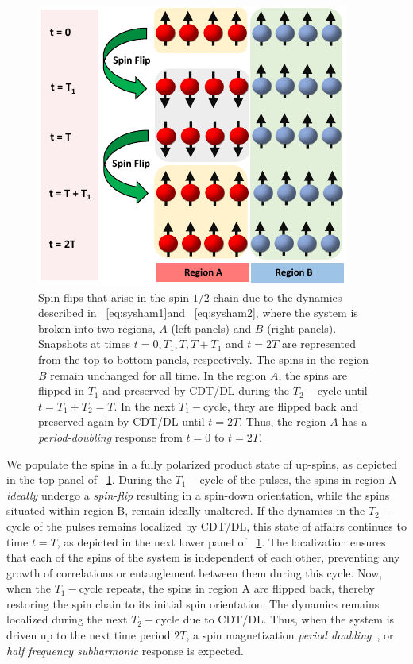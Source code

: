\documentclass[12pt]{iopart}
\providecommand{\DIFaddtex}[1]{{\protect\color{red}\uwave{#1}}} %
\providecommand{\DIFdeltex}[1]{{}}                      %
\providecommand{\DIFaddbegin}{} %
\providecommand{\DIFaddend}{} %
\providecommand{\DIFdelbegin}{} %
\providecommand{\DIFdelend}{} %
\providecommand{\DIFaddFL}[1]{\DIFadd{#1}} %
\providecommand{\DIFdelFL}[1]{\DIFdel{#1}} %
\providecommand{\DIFaddbeginFL}{} %
\providecommand{\DIFaddendFL}{} %
\providecommand{\DIFdelbeginFL}{} %
\providecommand{\DIFdelendFL}{} %
\providecommand{\DIFadd}[1]{\texorpdfstring{\DIFaddtex{#1}}{#1}} %
\providecommand{\DIFdel}[1]{\texorpdfstring{\DIFdeltex{#1}}{}} %
\newcommand{\DIFscaledelfig}{0.5}
\newlength{\DIFdelgraphicswidth} %
\newlength{\DIFdelgraphicsheight} %
\newcommand{\DIFaddincludegraphics}[2][]{{\color{blue}\fbox{\DIFOincludegraphics[#1]{#2}}}} %
\newcommand{\DIFdelincludegraphics}[2][]{%
\sbox{\DIFdelgraphicsbox}{\DIFOincludegraphics[#1]{#2}}%
\settoboxwidth{\DIFdelgraphicswidth}{\DIFdelgraphicsbox} %
\settoboxtotalheight{\DIFdelgraphicsheight}{\DIFdelgraphicsbox} %
\scalebox{\DIFscaledelfig}{%
\parbox[b]{\DIFdelgraphicswidth}{\usebox{\DIFdelgraphicsbox}\\[-\baselineskip] \rule{\DIFdelgraphicswidth}{0em}}\llap{\resizebox{\DIFdelgraphicswidth}{\DIFdelgraphicsheight}{%
\setlength{\unitlength}{\DIFdelgraphicswidth}%
\begin{picture}(1,1)%
\thicklines\linethickness{2pt} %
{\color[rgb]{1,0,0}\put(0,0){\framebox(1,1){}}}%
{\color[rgb]{1,0,0}\put(0,0){\line( 1,1){1}}}%
{\color[rgb]{1,0,0}\put(0,1){\line(1,-1){1}}}%
\end{picture}%
}\hspace*{3pt}}} %
} %
\DeclareRobustCommand{\DIFaddbegin}{\DIFOaddbegin \let\includegraphics\DIFaddincludegraphics} %
\DeclareRobustCommand{\DIFaddend}{\DIFOaddend \let\includegraphics\DIFOincludegraphics} %
\DeclareRobustCommand{\DIFdelbegin}{\DIFOdelbegin \let\includegraphics\DIFdelincludegraphics} %
\DeclareRobustCommand{\DIFdelend}{\DIFOaddend \let\includegraphics\DIFOincludegraphics} %
\DeclareRobustCommand{\DIFaddbeginFL}{\DIFOaddbeginFL \let\includegraphics\DIFaddincludegraphics} %
\DeclareRobustCommand{\DIFaddendFL}{\DIFOaddendFL \let\includegraphics\DIFOincludegraphics} %
\DeclareRobustCommand{\DIFdelbeginFL}{\DIFOdelbeginFL \let\includegraphics\DIFdelincludegraphics} %
\DeclareRobustCommand{\DIFdelendFL}{\DIFOaddendFL \let\includegraphics\DIFOincludegraphics} %
\begin{document}
\begin{figure}[t!]
    \centering
    \includegraphics[width=7.cm]{figure2.pdf}
    \caption{Spin-flips that arise in the spin-$1/2$ chain due to the dynamics described in \DIFdelbeginFL \DIFdelFL{Eqs.}\DIFdelendFL \DIFaddbeginFL \DIFaddFL{equations (}\DIFaddendFL ~\ref{eq:sysham1}\DIFaddbeginFL \DIFaddFL{) }\DIFaddendFL and \DIFaddbeginFL \DIFaddFL{(}\DIFaddendFL ~\ref{eq:sysham2}\DIFaddbeginFL \DIFaddFL{)}\DIFaddendFL , where the system is broken into two regions, $A$ (left panels) and $B$ (right panels). Snapshots at times $t=0, T_1, T, T+T_1 $ and $t=2T$ are represented from the top to bottom panels, respectively. The spins in the region $B$ remain unchanged for all time. In the region $A$, the spins are flipped in $T_1$ and preserved by CDT/DL during the $T_2-$cycle until $t=T_1+T_2=T$. In the next $T_1-$cycle, they are flipped back and preserved again by CDT/DL until $t=2T$. Thus, the region $A$ has a \textit{period-doubling} response from $t=0$ to $t=2T$.}
    \label{Fig:spinflip}
\end{figure}

	We populate the spins in a fully polarized product state of up-spins, as depicted in the top panel of \DIFdelbegin \DIFdel{Fig.}\DIFdelend \DIFaddbegin \DIFadd{figure}\DIFaddend ~\ref{Fig:spinflip}. During the $T_1-$cycle of the pulses,  the spins in region A \textit{ideally} undergo a \textit{spin-flip} resulting in a spin-down orientation, while the spins situated within region B, remain ideally unaltered. If the dynamics in the $T_2-$cycle of the pulses remains localized by CDT/DL, this state of affairs continues to time $t=T$, as depicted in the next lower panel of \DIFdelbegin \DIFdel{Fig.}\DIFdelend \DIFaddbegin \DIFadd{figure}\DIFaddend ~\ref{Fig:spinflip}. The localization ensures that each of the spins of the system is independent of each other, preventing any growth of correlations or entanglement between them during this cycle. Now, when the $T_1-$cycle repeats, the spins in region A are flipped back, thereby restoring the spin chain to its initial spin orientation. The dynamics remains localized during the next $T_2-$cycle due to CDT/DL. Thus, when the system is driven up to the next time period $2T$, a spin magnetization \textit{period doubling}~\cite{rovny_31mathrmp_2018, Pan2020}, or \textit{half frequency subharmonic} response is expected. 
\end{document}
